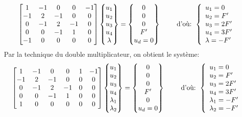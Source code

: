 \begin{equation}
\MM*{1& -1 & 0 & 0 & -1 \\ -1 & 2 & -1 & 0 & 0 \\ 0 & -1 & 2 & -1 & 0\\ 0&0&-1&1& 0 \\ -1&0&0&0&0}
\VV*{u_1\\u_2\\u_3\\u_4\\ \lambda}
=
\VV*{0\\0\\0\\F' \\ u_d=0}
\qquad \text{ d'où: } 
\left\{\begin{array}{l} u_1=0 \\ u_2=F' \\ u_3=2F' \\ u_4=3F' \\ \lambda = -F' \end{array}\right.
\end{equation}
\medskipvm
Par la technique du double multiplicateur, on obtient le système:
\begin{equation}
\MM*{1 & -1 & 0 & 0 & 1&-1 \\ -1 & 2 & -1 & 0 & 0&0 \\ 0 & -1 & 2 & -1 & 0&0\\ 0&0&-1&1& 0&0 \\ 1&0&0&0&0&0}
\VV*{u_1\\u_2\\u_3\\u_4\\ \lambda_1 \\ \lambda_2}
=
\VV*{0\\0\\0\\F' \\ 0 \\ u_d=0}
\qquad \text{ d'où: } 
\left\{\begin{array}{l} u_1=0 \\ u_2=F' \\ u_3=2F' \\ u_4=3F' \\ \lambda_1 = -F' \\ \lambda_2 = -F' \end{array}\right.
\end{equation}
